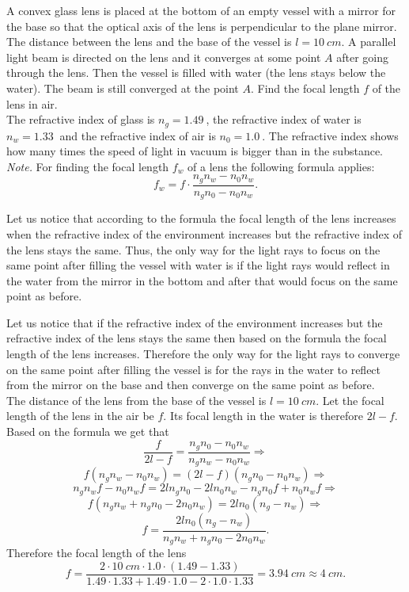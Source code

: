 {\ifEngStatement
A convex glass lens is placed at the bottom of an empty vessel with a mirror for the base so that the optical axis of the lens is perpendicular to the plane mirror. The distance between the lens and the base of the vessel is $l=\SI{10}{cm}$. A parallel light beam is directed on the lens and it converges at some point $A$ after going through the lens. Then the vessel is filled with water (the lens stays below the water). The beam is still converged at the point $A$. Find the focal length $f$ of the lens in air. \\
The refractive index of glass is $n_g = \SI{1,49}{}$, the refractive index of water is $n_w = \SI{1,33}{}$ and the refractive index of air is $n_0 = \SI{1,0}{}$. The refractive index shows how many times the speed of light in vacuum is bigger than in the substance. \\
\emph{Note.} For finding the focal length $f_w$ of a lens the following formula applies:
\[ f_w = f\cdot\frac{n_g n_w - n_0 n_w}{n_g n_0 - n_0 n_w}. \]
\fi


\ifEngHint
Let us notice that according to the formula the focal length of the lens increases when the refractive index of the environment increases but the refractive index of the lens stays the same. Thus, the only way for the light rays to focus on the same point after filling the vessel with water is if the light rays would reflect in the water from the mirror in the bottom and after that would focus on the same point as before.
\fi


\ifEngSolution
Let us notice that if the refractive index of the environment increases but the refractive index of the lens stays the same then based on the formula the focal length of the lens increases. Therefore the only way for the light rays to converge on the same point after filling the vessel is for the rays in the water to reflect from the mirror on the base and then converge on the same point as before.\\
The distance of the lens from the base of the vessel is $l = \SI{10}{cm}$. Let the focal length of the lens in the air be $f$. Its focal length in the water is therefore $2l-f$. Based on the formula we get that
\[ \frac{f}{2l-f} = \frac{n_g n_0 - n_0 n_w}{n_g n_w - n_0 n_w}\Rightarrow \] 
\[ f(n_g n_w - n_0 n_w) = (2l-f)(n_g n_0 - n_0 n_w)\Rightarrow \]
\[ n_g n_w f - n_0 n_w f = 2l n_g n_0 - 2l n_0 n_w - n_g n_0 f + n_0 n_w f\Rightarrow \]
\[ f (n_g n_w + n_g n_0 - 2 n_0 n_w) = 2l n_0 (n_g - n_w)\Rightarrow \]
\[ f = \frac{2l n_0 (n_g - n_w)}{n_g n_w + n_g n_0 - 2 n_0 n_w}. \]
Therefore the focal length of the lens
\[ f = \frac{\num{2} \cdot \SI{10}{cm} \cdot \num{1,0} \cdot (\num{1,49} - \num{1,33})}{\num{1,49}
\cdot \num{1,33} + \num{1,49} \cdot \num{1,0} - \num{2} \cdot \num{1,0} \cdot \num{1,33}} = \SI{3,94}{cm}
\approx \SI{4}{cm}. \]
\fi
}
